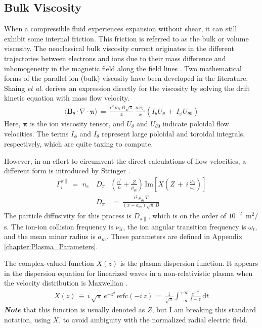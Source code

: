 \subsection{Bulk Viscosity}\label{ssec:bulk_viscosity}
When a compressible fluid experiences expansion without shear, it can still exhibit some internal friction.
This friction is referred to as the bulk or volume viscosity.
The neoclassical bulk viscosity current originates in the different trajectories between electrons and ions due to their mass difference and inhomogeneity in the magnetic field along the field lines \cite{kobayashi_model_2017}.
Two mathematical forms of the parallel ion (bulk) viscosity have been developed in the literature.
Shaing \emph{et al.} \cite{shaing_bifurcation_1990} derives an expression directly for the viscosity by solving the drift kinetic equation with mass flow velocity.
\begin{align}%
	\langle \mathbf{B}_\theta \cdot \nabla \cdot \boldsymbol{\pi} \rangle \,=\,
		\frac{\epsilon^2 \, m_i \, B \sqrt{\pi}}{4} \, \frac{n\,v_{T_i}}{x}
		\left(I_\theta U_\theta \,+\, I_\phi U_{\theta 0}\right)
		\label{eq:shaing_bulk}
\end{align}
Here, $\boldsymbol{\pi}$ is the ion viscosity tensor, and $U_\theta$ and $U_{\theta 0}$ indicate poloidal flow velocities.
The terms $I_\phi$ and $I_\theta$ represent large poloidal and toroidal integrals, respectively, which are quite taxing to compute.

However, in an effort to circumvent the direct calculations of flow velocities, a different form is introduced by Stringer \cite{stringer_explanation_1993}.
\begin{align} %
	\Gamma_i^{\pi\parallel} \,=\, \,n_e\,&D_{\pi\parallel}
		\left(\frac{n^\prime}{n} + \frac{Z}{\rho_{\theta i}}\right) \,
		\text{Im}\left[X\left(Z \,+\, i\,\frac{\nu_{ii}}{\omega_t}\right)\right]
		\label{eq:stringer_Gamma_bulk} \\
	&D_{\pi\parallel} \,=\, \frac{\epsilon^2\,\rho_{\theta i}\,T}
		{(x - a_m)\sqrt{\pi}\,B} \label{eq:stringer_D_bulk}
\end{align}
The particle diffusivity for this process is $D_{\pi\parallel}$, which is on the order of $10^{-2}$~m$^2 / $s.
The ion-ion collision frequency is $\nu_{ii}$, the ion angular transition frequency is $\omega_t$, and the mean minor radius is $a_m$.
These parameters are defined in Appendix \ref{chapter:Plasma_Parameters}.

The complex-valued function $X(z)$ is the plasma dispersion function.
It appears in the dispersion equation for linearized waves in a non-relativistic plasma when the velocity distribution is Maxwellian \cite{fried_plasma_2015}.
\begin{align} %
	X(z) \,\equiv\, i\,\sqrt{\pi} \, e^{-z^2} \, \text{erfc}(-i\,z) \,=\,
		\frac{1}{\sqrt{\pi}} \int_{-\infty}^{+\infty} \frac{e^{-t^2}}{t - z}
		\, \text{d}t \label{eq:plasma_disp}
\end{align}
\emph{\textbf{Note}} that this function is usually denoted as $Z$, but I am breaking this standard notation, using $X$, to avoid ambiguity with the normalized radial electric field.

